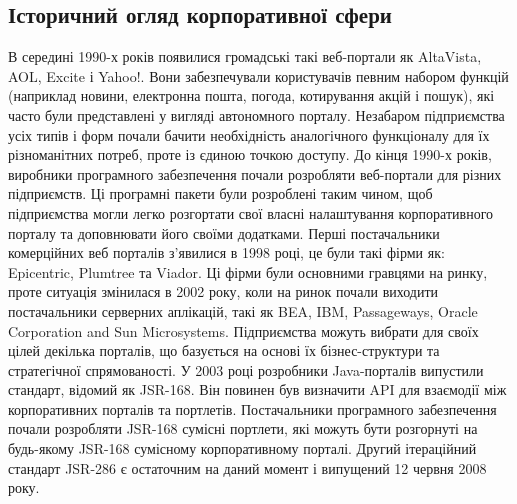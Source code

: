 \subsection{Історичний огляд корпоративної сфери}
В середині 1990-х років появилися громадські такі веб-портали як AltaVista, AOL, Excite і Yahoo!. 
Вони забезпечували користувачів певним набором функцій (наприклад новини, електронна пошта, погода, котирування акцій і пошук), які часто були представлені у вигляді автономного порталу.
Незабаром підприємства усіх типів і форм почали бачити необхідність аналогічного функціоналу для їх різноманітних потреб, проте із єдиною точкою доступу.
До кінця 1990-х років, виробники програмного забезпечення почали розробляти веб-портали для різних підприємств. 
Ці програмні пакети були розроблені таким чином, щоб підприємства могли легко розгортати свої власні налаштування корпоративного порталу та доповнювати його своїми додатками.
Перші постачальники комерційних веб порталів з'явилися в 1998 році, це були такі фірми як: Epicentric, Plumtree  та Viador. 
Ці фірми були основними гравцями на ринку, проте ситуація змінилася в 2002 року, коли на ринок почали виходити постачальники серверних аплікацій, такі як BEA, IBM, Passageways, Oracle Corporation and Sun Microsystems.
Підприємства можуть вибрати для своїх цілей декілька порталів, що базується на основі їх бізнес-структури та стратегічної спрямованості.
У 2003 році розробники Java-порталів випустили стандарт, відомий як JSR-168. 
Він повинен був визначити API для взаємодії між корпоративних порталів та портлетів.
Постачальники програмного забезпечення почали розробляти JSR-168 сумісні портлети, які можуть бути розгорнуті на будь-якому JSR-168 сумісному корпоративному порталі. 
Другий ітераційний стандарт JSR-286 є остаточним на даний момент і випущений 12 червня 2008 року.

